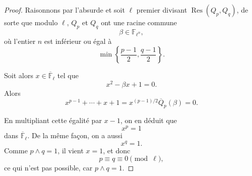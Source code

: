 \begin{proof}
Raisonnons par l'absurde et soit \(\ell\) premier divisant
\(\operatorname{Res}(Q_p,Q_q)\), de sorte que modulo \(\ell\), \(Q_p\) et
\(Q_q\) ont une racine commune
\[
\beta\in\mathbb{F}_{\ell^n},
\]
où l'entier \(n\) est inférieur ou égal à
\[
\min\left\{\frac{p-1}{2},\frac{q-1}{2}\right\}.
\]

Soit alors \(x \in \overline{\mathbb{F}}_\ell\) tel que
\[
x^2-\beta x+1=0.
\]
Alors
\[
x^{p-1}+\cdots+x+1
=
x^{(p-1)/2}\overline{Q}_p(\beta)
=
0.
\]

En multipliant cette égalité par \(x-1\), on en déduit que
\[
x^p=1
\]
dans \(\overline{\mathbb{F}}_\ell\). De la même façon, on a aussi
\[
x^q=1.
\]
Comme \(p\wedge q=1\), il vient \(x=1\), et donc
\[
p\equiv q\equiv 0 \pmod \ell,
\]
ce qui n'est pas possible, car \(p\wedge q=1\).
\end{proof}
